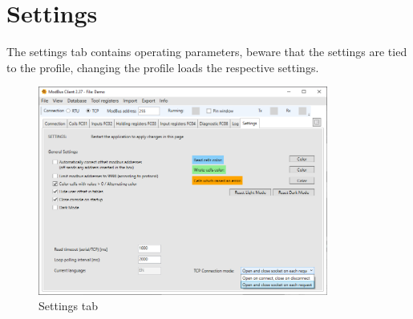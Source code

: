 
\chapter{Settings}

The settings tab contains operating parameters,
beware that the settings are tied to the profile,
changing the profile loads the respective settings.

\begin{figure}[H]
    \centering
    \includegraphics[width=0.85\textwidth]{../Img/Modbus_Client_Settings_00.PNG}
    \caption{Settings tab}
\end{figure}

